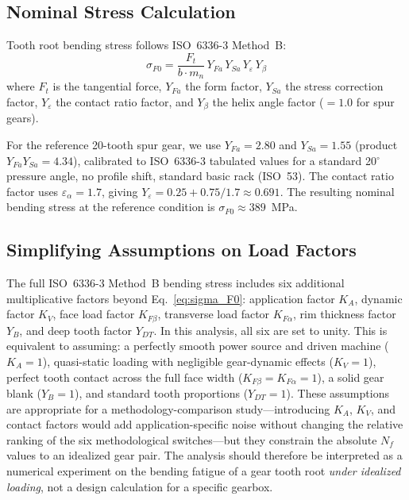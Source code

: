 \documentclass[12pt,a4paper]{article}
\begin{document}
\subsection{Nominal Stress Calculation}

Tooth root bending stress follows ISO~6336-3 Method~B:
\begin{equation}
\label{eq:sigma_F0}
\sigma_{F0} = \frac{F_t}{b \cdot m_n} \,
Y_{Fa} \, Y_{Sa} \, Y_\varepsilon \, Y_\beta
\end{equation}
where $F_t$ is the tangential force, $Y_{Fa}$ the form factor,
$Y_{Sa}$ the stress correction factor, $Y_\varepsilon$ the contact ratio
factor, and $Y_\beta$ the helix angle factor ($=1.0$ for spur gears).

For the reference 20-tooth spur gear, we use $Y_{Fa}=2.80$ and
$Y_{Sa}=1.55$ (product $Y_{Fa}Y_{Sa}=4.34$), calibrated to ISO~6336-3
tabulated values for a standard 20$^\circ$ pressure angle, no profile
shift, standard basic rack (ISO~53). The contact ratio factor uses
$\varepsilon_\alpha = 1.7$, giving $Y_\varepsilon = 0.25 + 0.75/1.7
\approx 0.691$. The resulting nominal bending stress at the reference
condition is $\sigma_{F0} \approx 389$~MPa.

\subsection{Simplifying Assumptions on Load Factors}

The full ISO~6336-3 Method~B bending stress includes six additional
multiplicative factors beyond Eq.~\ref{eq:sigma_F0}: application factor
$K_A$, dynamic factor $K_V$, face load factor $K_{F\beta}$, transverse
load factor $K_{F\alpha}$, rim thickness factor $Y_B$, and deep tooth
factor $Y_{DT}$. In this analysis, all six are set to unity. This is
equivalent to assuming: a perfectly smooth power source and driven
machine ($K_A=1$), quasi-static loading with negligible gear-dynamic
effects ($K_V=1$), perfect tooth contact across the full face width
($K_{F\beta}=K_{F\alpha}=1$), a solid gear blank ($Y_B=1$), and standard
tooth proportions ($Y_{DT}=1$). These assumptions are appropriate for a
methodology-comparison study---introducing $K_A$, $K_V$, and contact
factors would add application-specific noise without changing the
relative ranking of the six methodological switches---but they constrain
the absolute $N_f$ values to an idealized gear pair. The analysis should
therefore be interpreted as a numerical experiment on the bending
fatigue of a gear tooth root \emph{under idealized loading}, not a
design calculation for a specific gearbox.
\end{document}
